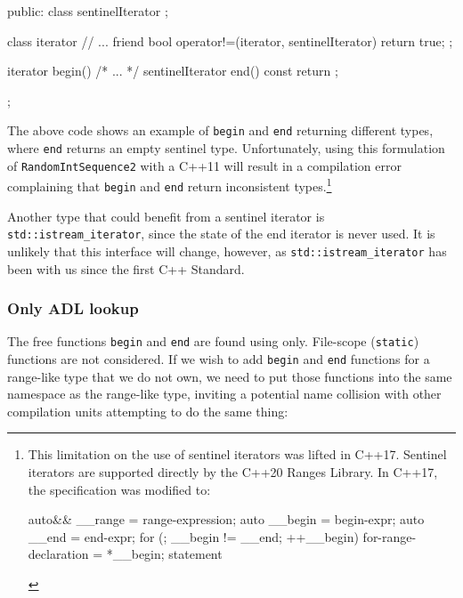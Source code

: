 {{{\begin{emcppslisting}
{public:
    class sentinelIterator { };

    class iterator {
        // ...
        friend bool operator!=(iterator, sentinelIterator) { return true; }
    };

    iterator         begin() { /* ... */ }
    sentinelIterator end() const { return {}; }
};
\end{emcppslisting}
    

\noindent The above code shows an example of \lstinline!begin! and \lstinline!end!
returning different types, where \lstinline!end! returns an empty sentinel
type. Unfortunately, using this formulation of
\lstinline!RandomIntSequence2!\linebreak[4]\newpage 
with a C++11  will result in a compilation error complaining that
\lstinline!begin! and \lstinline!end! return inconsistent
types.{\cprotect\footnote{This limitation on the use of sentinel
iterators was lifted in C++17. Sentinel iterators are supported
directly by the C++20 Ranges Library. In C++17, the specification was
modified to:

\begin{emcppslisting}[style=footcode]
{
    auto&& __range = range-expression;
    auto __begin   = begin-expr;
    auto __end     = end-expr;
    for (; __begin != __end; ++__begin)
    {
        for-range-declaration = *__begin;
        statement
    }
}
\end{emcppslisting}
      }}

Another type that could benefit from a sentinel iterator is
\lstinline!std::istream_iterator!, since the state of the end iterator is
never used. It is unlikely that this interface will change, however, as
\lstinline!std::istream_iterator! has been with us since the first C++
Standard.

\subsubsection[Only ADL lookup]{Only ADL lookup}\label{only-adl-lookup}

The free functions \lstinline!begin! and \lstinline!end! are found using
 only. File-scope
(\lstinline!static!) functions are not considered. If we wish to add
\lstinline!begin! and \lstinline!end! functions for a range-like type that we
do not own, we need to put those functions into the same namespace as
the range-like type, inviting a potential name collision with other
compilation units attempting to do the same thing:

}}}
